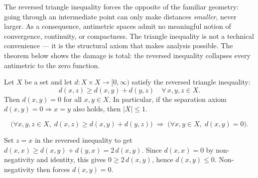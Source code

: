 \begin{remark*}
The reversed triangle inequality forces the opposite of the familiar
geometry: going through an intermediate point can only make distances
\emph{smaller}, never larger.
As a consequence, antimetric spaces admit no meaningful notion of
convergence, continuity, or compactness.
The triangle inequality is not a technical convenience --- it is the
structural axiom that makes analysis possible.
The theorem below shows the damage is total: the reversed inequality
collapses every antimetric to the zero function.
\end{remark*}

\begin{tcolorbox}[colback=thmbox, colframe=thmborder, arc=2pt,
  left=6pt, right=6pt, top=4pt, bottom=4pt,
  title={\small\textbf{Theorem (Degeneracy of the Antimetric)}},
  fonttitle=\small\bfseries]
\begin{theorem}
\label{thm:antimetric-degeneracy}
Let $X$ be a set and let $d : X \times X \to [0,\infty)$ satisfy the
reversed triangle inequality:
\[
d(x,z) \ge d(x,y) + d(y,z)
\quad \forall\, x,y,z \in X.
\]
Then $d(x,y) = 0$ for all $x,y \in X$.
In particular, if the separation axiom $d(x,y) = 0 \Rightarrow x = y$
also holds, then $|X| \le 1$.
\end{theorem}
\end{tcolorbox}

\begin{remark*}
\[
\bigl(\forall x,y,z \in X,\; d(x,z) \ge d(x,y)+d(y,z)\bigr)
\;\Rightarrow\;
\bigl(\forall x,y \in X,\; d(x,y) = 0\bigr).
\]
\end{remark*}

\begin{remark*}
Set $z = x$ in the reversed inequality to get
$d(x,x) \ge d(x,y) + d(y,x) = 2\,d(x,y)$.
Since $d(x,x) = 0$ by non-negativity and identity, this gives
$0 \ge 2\,d(x,y)$, hence $d(x,y) \le 0$.
Non-negativity then forces $d(x,y) = 0$.
\end{remark*}